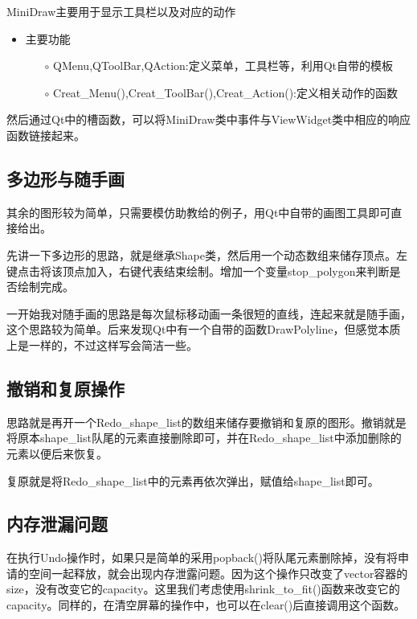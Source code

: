 \documentclass{article}
\begin{document}
MiniDraw主要用于显示工具栏以及对应的动作

\begin{itemize}
	\item 主要功能
	\begin{itemize}
		\item[$\circ$] QMenu,QToolBar,QAction:定义菜单，工具栏等，利用Qt自带的模板
	\end{itemize}
	\begin{itemize}
		\item[$\circ$]  Creat\_Menu(),Creat\_ToolBar(),Creat\_Action():定义相关动作的函数
	\end{itemize}
\end{itemize}

然后通过Qt中的槽函数，可以将MiniDraw类中事件与ViewWidget类中相应的响应函数链接起来。

\subsection{多边形与随手画}

其余的图形较为简单，只需要模仿助教给的例子，用Qt中自带的画图工具即可直接给出。

先讲一下多边形的思路，就是继承Shape类，然后用一个动态数组来储存顶点。左键点击将该顶点加入，右键代表结束绘制。增加一个变量stop\_polygon来判断是否绘制完成。

一开始我对随手画的思路是每次鼠标移动画一条很短的直线，连起来就是随手画，这个思路较为简单。后来发现Qt中有一个自带的函数DrawPolyline，但感觉本质上是一样的，不过这样写会简洁一些。


\subsection{撤销和复原操作}

思路就是再开一个Redo\_shape\_list的数组来储存要撤销和复原的图形。撤销就是将原本shape\_list队尾的元素直接删除即可，并在Redo\_shape\_list中添加删除的元素以便后来恢复。

复原就是将Redo\_shape\_list中的元素再依次弹出，赋值给shape\_list即可。

\subsection{内存泄漏问题}

在执行Undo操作时，如果只是简单的采用popback()将队尾元素删除掉，没有将申请的空间一起释放，就会出现内存泄露问题。因为这个操作只改变了vector容器的size，没有改变它的capacity。这里我们考虑使用shrink\_to\_fit()函数来改变它的capacity。同样的，在清空屏幕的操作中，也可以在clear()后直接调用这个函数。
\end{document}
